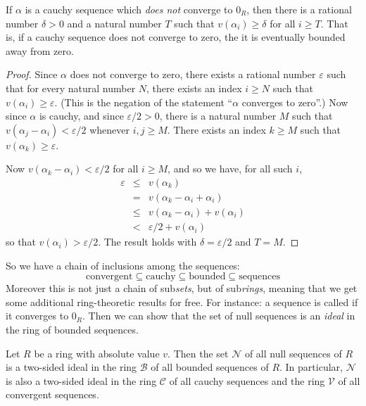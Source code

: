 \begin{prop} \label{prop:cauchy-bound-away-from-zero}
If \(\alpha\) is a cauchy sequence which \emph{does not} converge to \(0_R\), then there is a rational number \(\delta > 0\) and a natural number \(T\) such that \(v(\alpha_i) \geq \delta\) for all \(i \geq T\). That is, if a cauchy sequence does not converge to zero, the it is eventually bounded away from zero.
\end{prop}

\begin{proof}
Since \(\alpha\) does not converge to zero, there exists a rational number \(\varepsilon\) such that for every natural number \(N\), there exists an index \(i \geq N\) such that \(v(\alpha_i) \geq \varepsilon\). (This is the negation of the statement ``\(\alpha\) converges to zero''.) Now since \(\alpha\) is cauchy, and since \(\varepsilon/2 > 0\), there is a natural number \(M\) such that \(v(\alpha_j - \alpha_i) < \varepsilon/2\) whenever \(i,j \geq M\). There exists an index \(k \geq M\) such that \(v(\alpha_k) \geq \varepsilon\).

Now \(v(\alpha_k - \alpha_i) < \varepsilon/2\) for all \(i \geq M\), and so we have, for all such \(i\),
\begin{eqnarray*}
\varepsilon & \leq & v(\alpha_k) \\
 & = & v(\alpha_k - \alpha_i + \alpha_i) \\
 & \leq & v(\alpha_k - \alpha_i) + v(\alpha_i) \\
 & < & \varepsilon/2 + v(\alpha_i)
\end{eqnarray*}
so that \(v(\alpha_i) > \varepsilon/2\). The result holds with \(\delta = \varepsilon/2\) and \(T = M\). 
\end{proof}

So we have a chain of inclusions among the sequences: \[ \mathrm{convergent} \subseteq \mathrm{cauchy} \subseteq \mathrm{bounded} \subseteq \mathrm{sequences} \] Moreover this is not just a chain of sub\emph{sets}, but of sub\emph{rings}, meaning that we get some additional ring-theoretic results for free. For instance: a sequence is called  if it converges to \(0_R\). Then we can show that the set of null sequences is an \emph{ideal} in the ring of bounded sequences.

\begin{prop}
Let \(R\) be a ring with absolute value \(v\). Then the set \(\mathcal{N}\) of all null sequences of \(R\) is a two-sided ideal in the ring \(\mathcal{B}\) of all bounded sequences of \(R\). In particular, \(\mathcal{N}\) is also a two-sided ideal in the ring \(\mathcal{C}\) of all cauchy sequences and the ring \(\mathcal{V}\) of all convergent sequences.
\end{prop}

